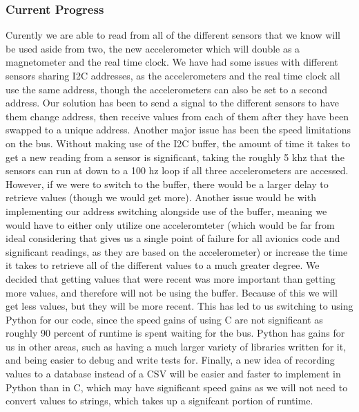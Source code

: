 \documentclass[onecolumn, draftclsnofoot, 10pt, compsoc]{IEEEtran}
\begin{document}
\subsubsection{Current Progress}
Curently we are able to read from all of the different sensors that we know will be used aside from two, the new accelerometer which will double as a magnetometer and the real time clock. We have had some issues with different sensors sharing I2C addresses, as the accelerometers and the real time clock all use the same address, though the accelerometers can also be set to a second address. Our solution has been to send a signal to the different sensors to have them change address, then receive values from each of them after they have been swapped to a unique address. Another major issue has been the speed limitations on the bus. Without making use of the I2C buffer, the amount of time it takes to get a new reading from a sensor is significant, taking the roughly 5 khz that the sensors can run at down to a 100 hz loop if all three accelerometers are accessed. However, if we were to switch to the buffer, there would be a larger delay to retrieve values (though we would get more). Another issue would be with implementing our address switching alongside use of the buffer, meaning we would have to either only utilize one acceleromteter (which would be far from ideal considering that gives us a single point of failure for all avionics code and significant readings, as they are based on the accelerometer) or increase the time it takes to retrieve all of the different values to a much greater degree. We decided that getting values that were recent was more important than getting more values, and therefore will not be using the buffer. Because of this we will get less values, but they will be more recent. This has led to us switching to using Python for our code, since the speed gains of using C are not significant as roughly 90 percent of runtime is spent waiting for the bus. Python has gains for us in other areas, such as having a much larger variety of libraries written for it, and being easier to debug and write tests for. Finally, a new idea of recording values to a database instead of a CSV will be easier and faster to implement in Python than in C, which may have significant speed gains as we will not need to convert values to strings, which takes up a signifcant portion of runtime.
\end{document}
